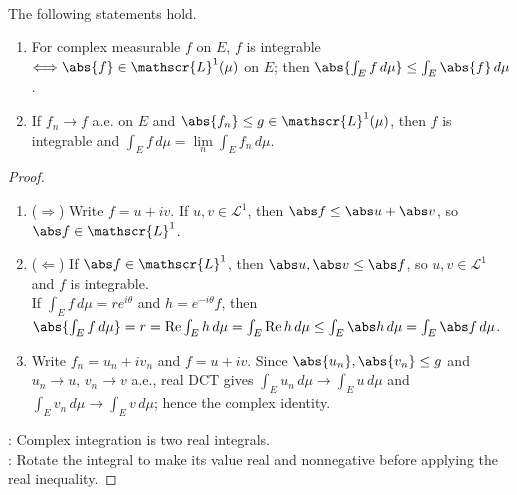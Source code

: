 \begin{proposition} \label{prop:complex-l1-absolute-integrability-and-dct} \\
The following statements hold.
\begin{enumerate}[label=(\roman*)]
\setlength{\itemsep}{0pt}
\item For complex measurable $f$ on $E$, $f$ is integrable $\Longleftrightarrow \abs{f}\in\mathscr{L}^1(\mu)$ on $E$; then $\abs{\int_Ef\,d\mu}\leq\int_E\abs{f}\,d\mu$.
\item If $f_n\to f$ a.e. on $E$ and $\abs{f_n}\leq g\in\mathscr{L}^1(\mu)$, then $f$ is integrable and $\int_Ef\,d\mu=\lim\limits_n\int_Ef_n\,d\mu$.
\end{enumerate}
\begin{proof}
\begin{enumerate}[label=(\roman*)]
\setlength{\itemsep}{0pt}
\item[$(i)$] ($\Rightarrow$) Write $f=u+iv$. If $u,v\in\mathscr{L}^1$, then $\abs f\leq\abs u+\abs v$, so $\abs f\in\mathscr{L}^1$.
\item[$(i)$] ($\Leftarrow$) If $\abs f\in\mathscr{L}^1$, then $\abs u,\abs v\leq\abs f$, so $u,v\in\mathscr{L}^1$ and $f$ is integrable.\\
If $\int_Ef\,d\mu=re^{i\theta}$ and $h=e^{-i\theta}f$, then $\abs{\int_Ef\,d\mu}=r=\operatorname{Re}\int_Eh\,d\mu=\int_E\operatorname{Re}h\,d\mu\leq\int_E\abs h\,d\mu=\int_E\abs f\,d\mu$.
\item[$(ii)$] Write $f_n=u_n+iv_n$ and $f=u+iv$. Since $\abs{u_n},\abs{v_n}\leq g$ and $u_n\to u$, $v_n\to v$ a.e., real DCT gives $\int_Eu_n\,d\mu\to\int_Eu\,d\mu$ and $\int_Ev_n\,d\mu\to\int_Ev\,d\mu$; hence the complex identity.
\end{enumerate}
: Complex integration is two real integrals.\\
: Rotate the integral to make its value real and nonnegative before applying the real inequality.
\end{proof}
\end{proposition}

